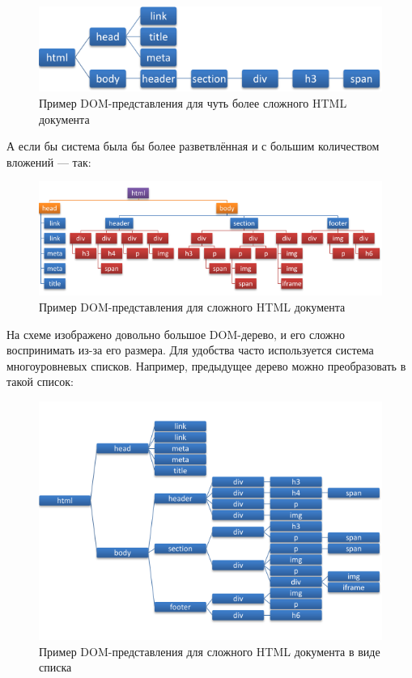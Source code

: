 \begin{figure}[h]
	\centering
	\includegraphics[width=150mm]{img/simple-dom-2.png}
	\caption{Пример DOM-представления для чуть более сложного HTML документа}
	\label{fig:simple-dom-2}
\end{figure}

\clearpage

А если бы система была бы более разветвлённая и с большим количеством вложений --- так:

\begin{figure}[h]
	\centering
	\includegraphics[width=150mm]{img/complicated-dom.png}
	\caption{Пример DOM-представления для сложного HTML документа}
	\label{fig:complicated-dom}
\end{figure}

На схеме изображено довольно большое DOM-дерево, и его сложно воспринимать из-за его размера.
Для удобства часто используется система многоуровневых списков. 
Например, предыдущее дерево можно преобразовать в такой список:

\begin{figure}[h]
	\centering
	\includegraphics[width=150mm]{img/complicated-dom-list.png}
	\caption{Пример DOM-представления для сложного HTML документа в виде списка}
	\label{fig:complicated-dom-list}
\end{figure}

